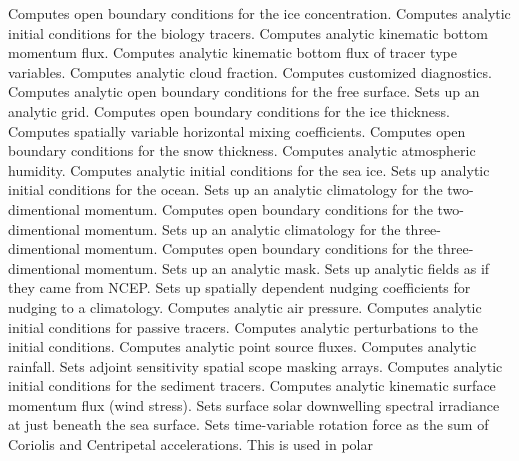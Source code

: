    \begin{klist}
      Computes open boundary conditions for the ice
   concentration.
      Computes analytic initial conditions for the
   biology tracers.
       Computes analytic kinematic bottom
   momentum flux.
       Computes analytic kinematic bottom flux of
   tracer type variables.
      Computes analytic cloud fraction.
      Computes customized diagnostics.
      Computes analytic open boundary conditions for
   the free surface.
       Sets up an analytic grid.
      Computes open boundary conditions for the ice
   thickness.
      Computes spatially variable horizontal mixing
   coefficients.
      Computes open boundary conditions for the snow
   thickness.
      Computes analytic atmospheric humidity.
      Computes analytic initial conditions for the sea ice.
       Sets up analytic initial conditions for the ocean.
      Sets up an analytic climatology for the
   two-dimentional momentum.
      Computes open boundary conditions for the
   two-dimentional momentum.
      Sets up an analytic climatology for the
   three-dimentional momentum.
      Computes open boundary conditions for the
   three-dimentional momentum.
       Sets up an analytic mask.
       Sets up analytic fields as if they came from NCEP.
       Sets up spatially dependent nudging
   coefficients for nudging to a climatology.
       Computes analytic air pressure.
       Computes analytic initial conditions for
   passive tracers.
       Computes analytic perturbations to the
   initial conditions.
       Computes analytic point source fluxes.
       Computes analytic rainfall.
       Sets adjoint sensitivity spatial scope masking
   arrays.
       Computes analytic initial conditions for the
   sediment tracers.
       Computes analytic kinematic surface
   momentum flux (wind stress).
       Sets surface solar downwelling spectral
     irradiance at just beneath the sea surface.
       Sets time-variable rotation force as the
   sum of Coriolis and Centripetal accelerations.  This is used in polar

\end{klist}
